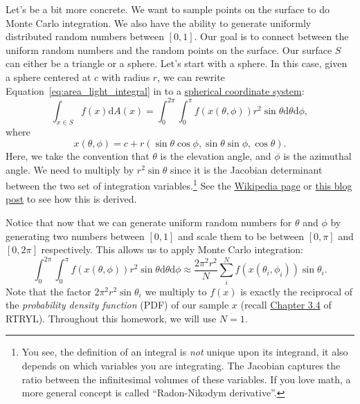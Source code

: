 Let's be a bit more concrete. We want to sample points on the surface to do Monte Carlo integration.
We also have the ability to generate uniformly distributed random numbers between $[0, 1]$. Our goal is to connect between the uniform random numbers and the random points on the surface.
Our surface $S$ can either be a triangle or a sphere. Let's start with a sphere. In this case, given a sphere centered at $c$ with radius $r$, we can rewrite Equation~\eqref{eq:area_light_integral} in to a \href{https://en.wikipedia.org/wiki/Spherical_coordinate_system}{spherical coordinate system}:
\begin{equation}
    \int_{x \in S} f(x) \mathrm{d}A(x) = \int_{0}^{2\pi}\int_{0}^{\pi} f(x(\theta, \phi)) r^2 \sin\theta \mathrm{d}\theta \mathrm{d} \phi,
    \label{eq:area_light_spherical}
\end{equation}
where
\begin{equation}
    x(\theta, \phi) = c + r \left(\sin\theta \cos\phi, \sin\theta \sin\phi, \cos\theta \right).
\end{equation}
Here, we take the convention that $\theta$ is the elevation angle, and $\phi$ is the azimuthal angle. We need to multiply by $r^2 \sin\theta$ since it is the Jacobian determinant between the two set of integration variables.\footnote{You see, the definition of an integral is \emph{not} unique upon its integrand, it also depends on which variables you are integrating. The Jacobian captures the ratio between the infinitesimal volumes of these variables. If you love math, a more general concept is called ``Radon-Nikodym derivative''.} See the \href{https://en.wikipedia.org/wiki/Spherical_coordinate_system#Integration_and_differentiation_in_spherical_coordinates}{Wikipedia page} or \href{http://6degreesoffreedom.co/circle-random-sampling/}{this blog post} to see how this is derived.

Notice that now that we can generate uniform random numbers for $\theta$ and $\phi$ by generating two numbers between $[0, 1]$ and scale them to be between $[0, \pi]$ and $[0, 2\pi]$ respectively. This allows us to apply Monte Carlo integration:
\begin{equation}
    \int_{0}^{2\pi}\int_{0}^{\pi} f(x(\theta, \phi)) r^2 \sin\theta \mathrm{d}\theta \mathrm{d} \phi
    \approx \frac{2\pi^2 r^2}{N} \sum_i^N f(x(\theta_i, \phi_i))\sin\theta_i.
    \label{eq:naive_monte_carlo_sphere}
\end{equation}
Note that the factor $2\pi^2 r^2 \sin\theta_i$ we multiply to $f(x)$ is exactly the reciprocal of the \emph{probability density function} (PDF) of our sample $x$ (recall \href{https://raytracing.github.io/books/RayTracingTheRestOfYourLife.html#onedimensionalmcintegration/importancesampling}{Chapter 3.4} of RTRYL). Throughout this homework, we will use $N=1$.

